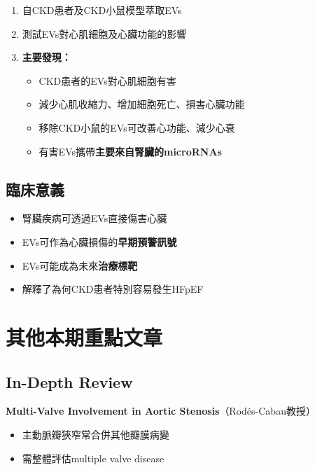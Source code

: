 \documentclass[12pt,a4paper]{article}
\begin{document}
\begin{enumerate}
    \item 自CKD患者及CKD小鼠模型萃取EVs
    \item 測試EVs對心肌細胞及心臟功能的影響
    \item \textbf{主要發現：}
    \begin{itemize}
        \item CKD患者的EVs對心肌細胞有害
        \item 減少心肌收縮力、增加細胞死亡、損害心臟功能
        \item 移除CKD小鼠的EVs可改善心功能、減少心衰
        \item 有害EVs攜帶\textbf{主要來自腎臟的microRNAs}
    \end{itemize}
\end{enumerate}

\subsection{臨床意義}

\begin{tcolorbox}[colback=emergency_blue!5!white,colframe=emergency_blue,title=\textbf{心腎交互作用新機轉}]
\begin{itemize}
    \item 腎臟疾病可透過EVs直接傷害心臟
    \item EVs可作為心臟損傷的\textbf{早期預警訊號}
    \item EVs可能成為未來\textbf{治療標靶}
    \item 解釋了為何CKD患者特別容易發生HFpEF
\end{itemize}
\end{tcolorbox}

\section{其他本期重點文章}

\subsection{In-Depth Review}

\textbf{Multi-Valve Involvement in Aortic Stenosis}（Rodés-Cabau教授）
\begin{itemize}
    \item 主動脈瓣狹窄常合併其他瓣膜病變
    \item 需整體評估multiple valve disease
\end{itemize}
\end{document}
